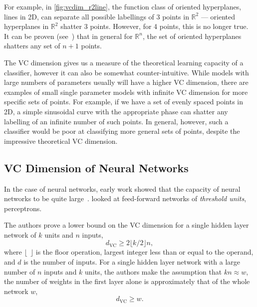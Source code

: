 \documentclass[thesis]{subfiles}
\begin{document}
    For example, in \cref{fig:vcdim_r2line}, the function class of oriented hyperplanes, \ie lines in 2D, can separate all possible labellings of 3 points in $\mathbb{R}^2$ --- oriented hyperplanes in $\mathbb{R}^2$ shatter 3 points. However, for 4 points, this is no longer true. It can be proven (see~\citet{burges1998tutorial}) that in general for $\mathbb{R}^n$, the set of oriented hyperplanes shatters any set of $n+1$ points.

    The VC dimension gives us a measure of the theoretical learning capacity of a classifier, however it can also be somewhat counter-intuitive. While models with large numbers of parameters usually will have a higher VC dimension, there are examples of small single parameter models with infinite VC dimension for more specific sets of points. For example, if we have a set of evenly spaced points in 2D, a simple sinusoidal curve with the appropriate phase can shatter any labelling of an infinite number of such points. In general, however, such a classifier would be poor at classifying more general sets of points, despite the impressive theoretical VC dimension.
    
    \subsection{VC Dimension of Neural Networks}
    In the case of neural networks, early work showed that the capacity of neural networks to be quite large~\citep{hornik89a,baum1989size}. \citet{baum1989size} looked at feed-forward networks of \emph{threshold units}, \ie perceptrons. %
    
    The authors prove a lower bound on the VC dimension for a single hidden layer network of $k$ units and $n$ inputs,
    \begin{equation}
        d_{\textrm{VC}} \geq 2 \lfloor k/2 \rfloor n,
    \end{equation}
    where $\lfloor \ \ \rfloor$ is the floor operation, \ie largest integer less than or equal to the operand, and $d$ is the number of inputs. For a single hidden layer network with a large number of $n$ inputs and $k$ units, the authors make the assumption that $kn\approx w$, \ie the number of weights in the first layer alone is approximately that of the whole network $w$,
    \begin{equation}
        d_{\textrm{VC}} \geq w.
    \end{equation}
\end{document}
